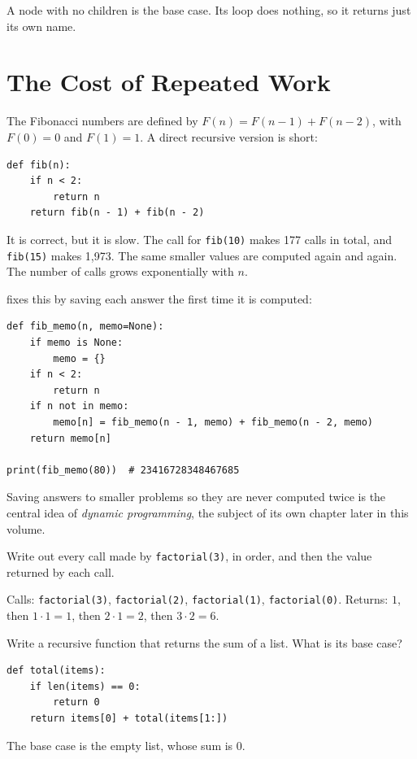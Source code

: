 A node with no children is the base case. Its loop does nothing, so it
returns just its own name.

\section{The Cost of Repeated Work}
The Fibonacci numbers are defined by $F(n) = F(n-1) + F(n-2)$, with $F(0) = 0$
and $F(1) = 1$. A direct recursive version is short:

\begin{verbatim}
def fib(n):
    if n < 2:
        return n
    return fib(n - 1) + fib(n - 2)
\end{verbatim}

It is correct, but it is slow. The call for \texttt{fib(10)} makes 177 calls in
total, and \texttt{fib(15)} makes 1,973. The same smaller values are computed
again and again. The number of calls grows exponentially with $n$.

 fixes this by saving each answer the first time it is
computed:

\begin{verbatim}
def fib_memo(n, memo=None):
    if memo is None:
        memo = {}
    if n < 2:
        return n
    if n not in memo:
        memo[n] = fib_memo(n - 1, memo) + fib_memo(n - 2, memo)
    return memo[n]

print(fib_memo(80))  # 23416728348467685
\end{verbatim}

Saving answers to smaller problems so they are never computed twice is the
central idea of \emph{dynamic programming}, the subject of its own chapter
later in this volume.

\begin{Exercise}[label=rec1, title=Trace the calls]
Write out every call made by \texttt{factorial(3)}, in order, and then the value
returned by each call.
\end{Exercise}
\begin{Answer}[ref=rec1]
Calls: \texttt{factorial(3)}, \texttt{factorial(2)}, \texttt{factorial(1)},
\texttt{factorial(0)}. Returns: $1$, then $1 \cdot 1 = 1$, then $2 \cdot 1 = 2$,
then $3 \cdot 2 = 6$.
\end{Answer}

\begin{Exercise}[label=rec2, title=Sum a list]
Write a recursive function  that returns the sum of a list.
What is its base case?
\end{Exercise}
\begin{Answer}[ref=rec2]
\begin{verbatim}
def total(items):
    if len(items) == 0:
        return 0
    return items[0] + total(items[1:])
\end{verbatim}
The base case is the empty list, whose sum is 0.
\end{Answer}

